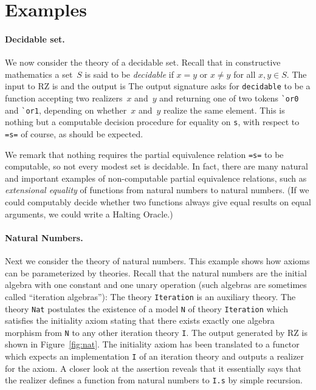 \section{Examples}
\label{sec:examples}

\paragraph{Decidable set.}
\label{sec:decidable-set}

We now consider the theory of a decidable set.
Recall that in constructive mathematics a set~$S$ is said to be
\emph{decidable} if $x = y$ or $x \neq y$ for all $x, y \in S$.
The input to RZ is
%
{\small{}}%
%
\noindent
and the output is
%
{\small{}}
%
\noindent
The output signature asks for \Verb|decidable| to be a function
accepting two realizers~$x$ and~$y$ and returning one of two tokens
\Verb|`or0| and \Verb|`or1|, depending on whether~$x$ and~$y$ realize
the same element. This is nothing but a computable decision procedure
for equality on \Verb|s|, with respect to \Verb|=s=| of course, as
should be expected.

We remark that nothing requires the partial equivalence relation
\Verb|=s=| to be computable, so not every modest set is decidable. In
fact, there are many natural and important examples of non-computable partial
equivalence relations, such as \emph{extensional equality} of functions
from natural numbers to natural numbers. (If we could computably
decide whether two functions always give equal results on equal
arguments, we could write a Halting Oracle.)

\paragraph{Natural Numbers.}
\label{sec:natural-numb}

Next we consider the theory of natural numbers. This example shows how
axioms can be parameterized by theories. Recall that the natural
numbers are the initial algebra with one constant and one unary
operation (such algebras are sometimes called ``iteration algebras''):
%
{\small{}}%
%
\noindent
The theory \Verb|Iteration| is an auxiliary theory. The theory
\Verb|Nat| postulates the existence of a model \Verb|N| of theory
\Verb|Iteration| which satisfies the initiality axiom stating that
there exists exactly one algebra morphism from \Verb|N| to any other
iteration theory \Verb|I|. The output generated by RZ is shown in
Figure~\ref{fig:nat}. The initiality axiom has been translated to a
functor which expects an implementation \Verb|I| of an iteration
theory and outputs a realizer for the axiom. A closer look at the
assertion reveals that it essentially says that the realizer defines a
function from natural numbers to \Verb|I.s| by simple recursion.

